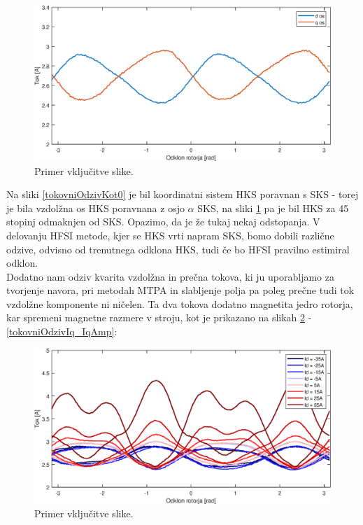 \documentclass[a4paper,twoside,openright,12pt,slovene]{book}
\begin{document}
\begin{figure}[!htbp]
    \centering
    \includegraphics[width=1\columnwidth]{Slike/tokovniOdzivKot45.eps}
    \caption{\label{tokovniOdzivKot45} Primer vključitve slike.}
\end{figure}

Na sliki \ref{tokovniOdzivKot0} je bil koordinatni sistem HKS poravnan s SKS - torej je bila vzdolžna os HKS poravnana z osjo $\alpha$ SKS, na sliki \ref{tokovniOdzivKot45} pa je bil HKS za 45 stopinj
odmaknjen od SKS. Opazimo, da je že tukaj nekaj odstopanja. V delovanju HFSI metode, kjer se HKS vrti napram SKS, bomo dobili različne odzive, odvisno od trenutnega odklona HKS, tudi če bo HFSI
pravilno estimiral odklon.
\\
Dodatno nam odziv kvarita vzdolžna in prečna tokova, ki ju uporabljamo za tvorjenje navora, pri metodah MTPA in slabljenje polja pa poleg prečne tudi tok vzdolžne komponente ni ničelen. Ta dva tokova
dodatno magnetita jedro rotorja, kar spremeni magnetne razmere v stroju, kot je prikazano na slikah \ref{tokovniOdzivId} - \ref{tokovniOdzivIq_IqAmp}:

\begin{figure}[!htbp]
    \centering
    \includegraphics[width=1\columnwidth]{Slike/tokovniOdzivId.eps}
    \caption{\label{tokovniOdzivId} Primer vključitve slike.}
\end{figure}
\end{document}
